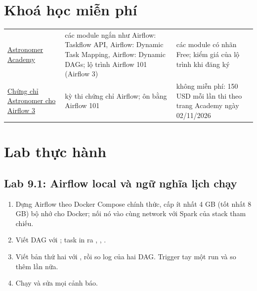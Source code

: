 \section{Khoá học miễn phí}
\begin{xltabular}{\textwidth}{@{}P{4.2cm} L P{2.6cm}@{}}
\toprule
{} &  &  \\
\midrule
\endhead
\bottomrule
\endfoot
\href{https://academy.astronomer.io}{Astronomer Academy} & các module ngắn như Airflow: Taskflow API, Airflow: Dynamic Task Mapping, Airflow: Dynamic DAGs; lộ trình Airflow 101 (Airflow 3) & các module có nhãn Free; kiểm giá của lộ trình khi đăng ký \\
\href{https://academy.astronomer.io}{Chứng chỉ Astronomer cho Airflow 3} & kỳ thi chứng chỉ Airflow; ôn bằng Airflow 101 & không miễn phí: 150 USD mỗi lần thi theo trang Academy ngày 02/11/2026 \\
\end{xltabular}

\section{Lab thực hành}

\subsection{Lab 9.1: Airflow local và ngữ nghĩa lịch chạy}
\begin{enumerate}
  \item Dựng Airflow theo Docker Compose chính thức, cấp ít nhất 4 GB (tốt nhất 8 GB) bộ nhớ cho Docker; nối nó vào cùng network với Spark của stack tham chiếu.
  \item Viết DAG  với ; task in ra , , .
  \item Viết bản thứ hai với , rồi so log của hai DAG. Trigger tay một run và so thêm lần nữa.
  \item Chạy  và sửa mọi cảnh báo.
\end{enumerate}

